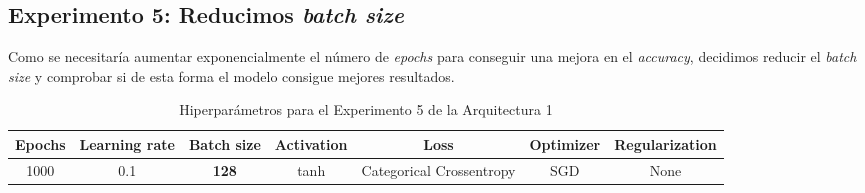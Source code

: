\documentclass{article}
\begin{document}
		\subsection{Experimento 5: Reducimos \textit{batch size}}
		\label{d-s-a1-e5}
			Como se necesitar\'ia aumentar exponencialmente el n\'umero de \textit{epochs} para conseguir una mejora en el \textit{accuracy}, decidimos reducir el \textit{batch size} y comprobar si de esta forma el modelo consigue mejores resultados.
			\begin{table}[!h]
				\begin{center}
					\begin{tabular}{| c | c | c | c | c | c | c |}
						\textbf{Epochs} & \textbf{Learning rate} & \textbf{Batch size} & \textbf{Activation} & \textbf{Loss} & \textbf{Optimizer} & \textbf{Regularization} \\ \hline
						1000 & 0.1 & \textbf{128} & tanh & Categorical Crossentropy & SGD & None
					\end{tabular}
					\caption{Hiperpar\'ametros para el Experimento 5 de la Arquitectura 1}
					\label{tab:hip-d-a1-e5}
				\end{center}
			\end{table}
			
\end{document}
